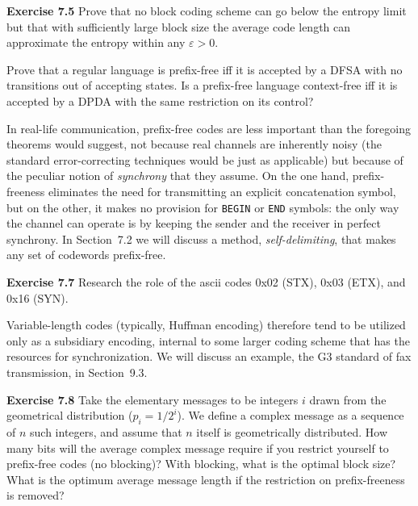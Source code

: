 \smallskip\noindent
{\bf Exercise 7.5} Prove that no block coding scheme can go below the 
entropy limit but that with sufficiently large block size the average code 
length can approximate the entropy within any $\varepsilon >0$.

\smallskip{} Prove that a regular language is
prefix-free iff it is accepted by a DFSA with no transitions out of accepting
states. Is a prefix-free language context-free iff it is accepted by a DPDA
with the same restriction on its control? 

\smallskip\noindent In real-life communication, prefix-free codes are less
important than the foregoing theorems would suggest, not because real channels
are inherently noisy (the standard error-correcting techniques would be just
as applicable) but because of the peculiar notion of {\it synchrony} that they
assume. On the one hand, prefix-freeness eliminates the need for transmitting
an explicit concatenation symbol, but on the other, it makes no provision for
{\tt BEGIN} or {\tt END} symbols: the only way the channel can operate is by
keeping the sender and the receiver in perfect synchrony. In Section~7.2 we
will discuss a method, {\it self-delimiting}, that makes any set of codewords
prefix-free.

\smallskip\noindent
{\bf Exercise 7.7} Research the role of the ascii codes 0x02 (STX), 0x03
(ETX), and 0x16 (SYN).   

\smallskip\noindent
Variable-length codes (typically, Huffman encoding) therefore tend to be 
utilized only as a subsidiary encoding, internal to some larger coding scheme
that has the resources for synchronization. We will discuss an example, the
G3 standard of fax transmission, in Section~9.3.

\smallskip\noindent
{\bf Exercise 7.8} Take the elementary messages to be integers $i$ drawn
from the geometrical distribution ($p_i = 1/2^i$). We define a complex message
as a sequence of $n$ such integers, and assume that $n$ itself is
geometrically distributed. How many bits will the average complex message
require if you restrict yourself to prefix-free codes (no blocking)? With
blocking, what is the optimal block size? What is the optimum average message
length if the restriction on prefix-freeness is removed?

